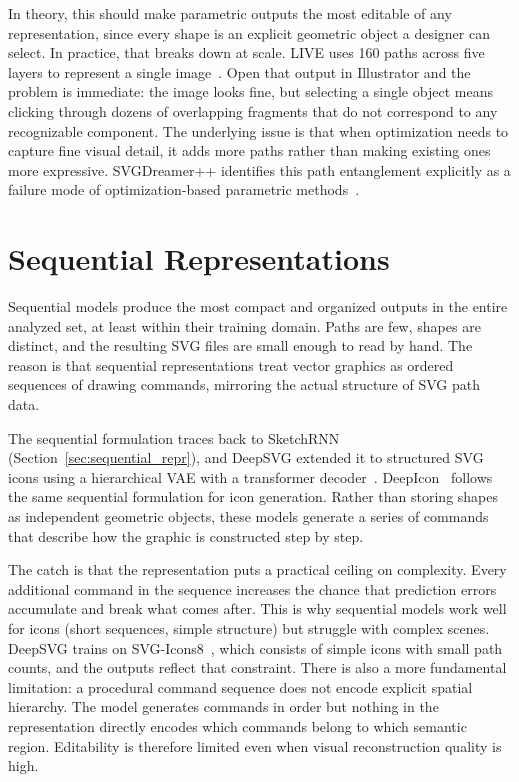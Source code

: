 In theory, this should make parametric outputs the most editable 
of any representation, since every shape is an explicit geometric 
object a designer can select. In practice, that breaks down at 
scale. LIVE uses 160 paths across five layers to represent a 
single image~\cite{maLayerwiseImageVectorization2022}. Open 
that output in Illustrator and the problem is immediate: the 
image looks fine, but selecting a single object means clicking 
through dozens of overlapping fragments that do not correspond 
to any recognizable component. The underlying issue is that 
when optimization needs to capture fine visual detail, it adds 
more paths rather than making existing ones more expressive. 
SVGDreamer++ identifies this path 
entanglement explicitly as a failure mode of optimization-based 
parametric 
methods~\cite{xingSVGDreamerAdvancingEditability2025}.

\section{Sequential Representations}

Sequential models produce the most compact and organized outputs in 
the entire analyzed set, at least within their training domain. 
Paths are few, shapes are distinct, and the resulting SVG files 
are small enough to read by hand. The reason is that sequential 
representations treat vector graphics as ordered sequences of 
drawing commands, mirroring the actual structure of SVG path data.

The sequential formulation traces back to SketchRNN 
(Section~\ref{sec:sequential_repr}), and DeepSVG extended 
it to structured SVG icons using a hierarchical VAE with a 
transformer 
decoder~\cite{carlierDeepSVGHierarchicalGenerative2020}.
DeepIcon~\cite{bingDeepIconHierarchicalNetwork2024} follows the 
same sequential formulation for icon generation. Rather than 
storing shapes as independent geometric objects, these models 
generate a series of commands that describe how the graphic is 
constructed step by step.

The catch is that the representation puts a practical ceiling on 
complexity. Every additional command in the sequence increases the 
chance that prediction errors accumulate and break what comes after. 
This is why sequential models work well for icons (short sequences, 
simple structure) but struggle with complex scenes. DeepSVG trains 
on SVG-Icons8~\cite{carlierDeepSVGHierarchicalGenerative2020}, 
which consists of simple icons with small path counts, and the 
outputs reflect that constraint. There is also a more fundamental 
limitation: a procedural command sequence does not encode explicit 
spatial hierarchy. The model generates commands in order but nothing 
in the representation directly encodes which commands belong to 
which semantic region. Editability is therefore limited even when 
visual reconstruction quality is high.



